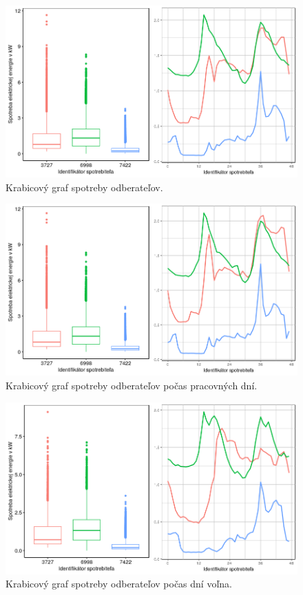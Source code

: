 \documentclass[a4paper,twoside,slovak,12pt,appendix]{article}
\begin{document}
\begin{figure}[htbp]
  \centering
  \includegraphics[width=\textwidth]{sample_plot.png}
  \caption{Krabicový graf spotreby odberateľov.}
  \label{fig:whole-plot}
\end{figure}

\begin{figure}[htbp]
  \centering
  \includegraphics[width=\textwidth]{workdays_plot.png}
  \caption{Krabicový graf spotreby odberateľov počas pracovných dní.}
  \label{fig:workdays-plot}
\end{figure}

\begin{figure}[htbp]
  \centering
  \includegraphics[width=\textwidth]{holidays_plot.png}
  \caption{Krabicový graf spotreby odberateľov počas dní voľna.}
  \label{fig:holidays-plot}
\end{figure}
\end{document}
